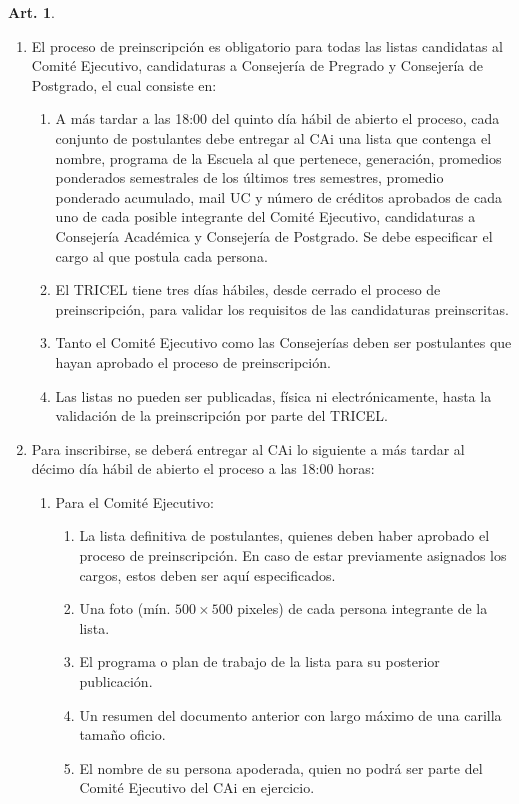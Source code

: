 \documentclass[letterpaper,11pt]{article}
\theoremstyle{definition}%
\newtheorem{art}{Art.} %
\begin{document}
\begin{art}
\begin{enumerate}
		\item El proceso de preinscripción es obligatorio para todas las listas candidatas al Comité Ejecutivo, candidaturas a Consejería de Pregrado y Consejería de Postgrado, el cual consiste en:
		      \begin{enumerate}
			      \item A más tardar a las 18:00 del quinto día hábil de abierto el proceso, cada conjunto
			            de postulantes debe entregar al CAi una lista que contenga el nombre, programa de la Escuela al que pertenece, generación, promedios ponderados semestrales de los últimos tres semestres, promedio ponderado acumulado, mail UC y número de créditos aprobados de cada uno de cada posible integrante del Comité Ejecutivo, candidaturas a Consejería Académica y  Consejería de Postgrado. Se debe especificar el cargo al que postula cada persona.

			      \item El TRICEL tiene tres días hábiles, desde cerrado el proceso de preinscripción, para validar los requisitos de las candidaturas preinscritas.

			      \item Tanto el Comité Ejecutivo como las Consejerías deben ser postulantes que hayan aprobado el proceso de preinscripción.

			      \item Las listas no pueden ser publicadas, física ni electrónicamente, hasta la validación de la preinscripción por parte del TRICEL\@.
		      \end{enumerate}

		\item Para inscribirse, se deberá entregar al CAi lo siguiente a más tardar al décimo día hábil de abierto el proceso a las 18:00 horas:
		      \begin{enumerate}
			      \item Para el Comité Ejecutivo:
			            \begin{enumerate}
				            \item La lista definitiva de postulantes, quienes deben haber aprobado el proceso de preinscripción. En caso de estar previamente asignados los cargos, estos deben ser aquí especificados.
				            \item Una foto (mín. $500 \times 500$ pixeles) de cada persona integrante de la lista.
				            \item El programa o plan de trabajo de la lista para su posterior publicación.
				            \item Un resumen del documento anterior con largo máximo de una carilla tamaño oficio.
				            \item El nombre de su persona apoderada, quien  no podrá ser parte del Comité Ejecutivo del CAi en ejercicio.
			            \end{enumerate}


\end{enumerate}
\end{enumerate}
\end{art}
\end{document}
